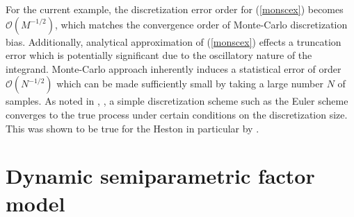 \documentclass{rQUF2e}
\theoremstyle{plain}
\theoremstyle{definition}
\begin{document}
	For the current example, the discretization error order for (\ref{monscex}) becomes $\mathcal{O}(M^{-1/2})$, which matches the convergence order of Monte-Carlo discretization bias. Additionally, analytical approximation of (\ref{monscex}) effects a truncation error which is potentially significant due to the oscillatory nature of the integrand. Monte-Carlo approach inherently induces a statistical error of order $\mathcal{O}(N^{-1/2})$ which can be made sufficiently small by taking a large number $N$ of samples. As noted in \citet{higham_mao}, \citet{lord_et_al}, a simple discretization scheme such as the Euler scheme converges to the true process under certain conditions on the discretization size. This was shown to be true for the Heston in particular by \cite{higham_mao}. 
	
	
	
	
	
	\section{Dynamic semiparametric factor model}
	
\end{document}
